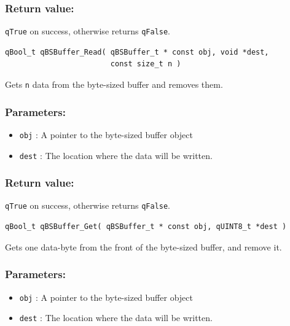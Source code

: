 \documentclass{article}
\begin{document}
\subsubsection*{Return value:}
\lstinline{qTrue} on success, otherwise returns \lstinline{qFalse}.

\noindent\hrulefill

\begin{lstlisting}[style=CStyle]
qBool_t qBSBuffer_Read( qBSBuffer_t * const obj, void *dest, 
                        const size_t n )
\end{lstlisting}

Gets \lstinline{n} data from the byte-sized buffer and removes them. 

\subsubsection*{Parameters:}
\begin{itemize}
    \item \lstinline{obj} : A pointer to the byte-sized buffer object
    \item \lstinline{dest} : The location where the data will be written.
\end{itemize}

\subsubsection*{Return value:}
\lstinline{qTrue} on success, otherwise returns \lstinline{qFalse}.

\noindent\hrulefill

\begin{lstlisting}[style=CStyle]
qBool_t qBSBuffer_Get( qBSBuffer_t * const obj, qUINT8_t *dest )
\end{lstlisting}

Gets one data-byte from the front of the byte-sized buffer, and remove it. 

\subsubsection*{Parameters:}
\begin{itemize}
    \item \lstinline{obj} : A pointer to the byte-sized buffer object
    \item \lstinline{dest} : The location where the data will be written.
\end{itemize}
\end{document}
